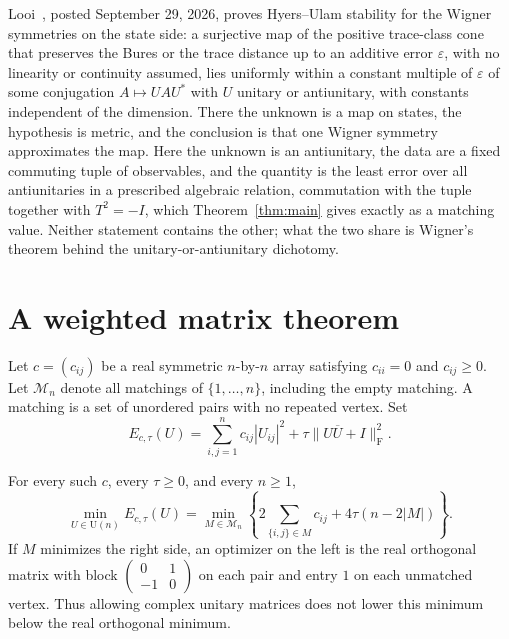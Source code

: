 \documentclass[11pt]{article}
\newcommand{\U}{\mathrm U}
\newcommand{\F}{\mathrm F}
\newcommand{\cM}{\mathcal M}
\begin{document}
Looi~\cite{looi}, posted September 29, 2026, proves Hyers--Ulam stability
for the Wigner symmetries on the state side: a surjective map of the
positive trace-class cone that preserves the Bures or the trace distance up
to an additive error $\varepsilon$, with no linearity or continuity assumed,
lies uniformly within a constant multiple of $\varepsilon$ of some
conjugation $A\mapsto UAU^*$ with $U$ unitary or antiunitary, with constants
independent of the dimension. There the unknown is a map on states, the
hypothesis is metric, and the conclusion is that one Wigner symmetry
approximates the map. Here the unknown is an antiunitary, the data are a
fixed commuting tuple of observables, and the quantity is the least error
over all antiunitaries in a prescribed algebraic relation, commutation with
the tuple together with $T^2=-I$, which Theorem~\ref{thm:main} gives
exactly as a matching value. Neither statement contains the other; what
the two share is Wigner's theorem behind the unitary-or-antiunitary
dichotomy.

\section{A weighted matrix theorem}

Let $c=(c_{ij})$ be a real symmetric $n$-by-$n$ array satisfying
$c_{ii}=0$ and $c_{ij}\geq0$. Let $\cM_n$ denote all matchings of
$\{1,\ldots,n\}$, including the empty matching. A matching is a set of
unordered pairs with no repeated vertex. Set
\begin{equation}\label{eq:weighted}
 E_{c,\tau}(U)=\sum_{i,j=1}^n c_{ij}|U_{ij}|^2
                     +\tau\|U\overline U+I\|_\F^2.
\end{equation}

\begin{theorem}\label{thm:main}
For every such $c$, every $\tau\geq0$, and every $n\geq1$,
\begin{equation}\label{eq:main}
 \min_{U\in\U(n)} E_{c,\tau}(U)
 =\min_{M\in\cM_n}
 \left\{2\sum_{\{i,j\}\in M}c_{ij}+4\tau(n-2|M|)\right\}.
\end{equation}
If $M$ minimizes the right side, an optimizer on the left is the real
orthogonal matrix with block $\left(\begin{smallmatrix}0&1\\-1&0
\end{smallmatrix}\right)$ on each pair and entry $1$ on each unmatched
vertex. Thus allowing complex unitary matrices does not lower this
minimum below the real orthogonal minimum.
\end{theorem}
\end{document}
